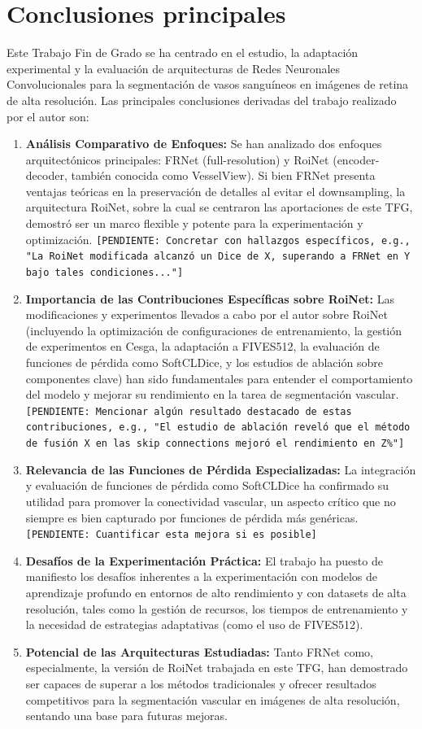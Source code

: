 \documentclass[11pt,a4paper]{report} %
\begin{document}
\section{Conclusiones principales}
Este Trabajo Fin de Grado se ha centrado en el estudio, la adaptación experimental y la evaluación de arquitecturas de Redes Neuronales Convolucionales para la segmentación de vasos sanguíneos en imágenes de retina de alta resolución. Las principales conclusiones derivadas del trabajo realizado por el autor son:
\begin{enumerate}
  \item \textbf{Análisis Comparativo de Enfoques:} Se han analizado dos enfoques arquitectónicos principales: FRNet (full-resolution) y RoiNet (encoder-decoder, también conocida como VesselView). Si bien FRNet presenta ventajas teóricas en la preservación de detalles al evitar el downsampling, la arquitectura RoiNet, sobre la cual se centraron las aportaciones de este TFG, demostró ser un marco flexible y potente para la experimentación y optimización. \texttt{[PENDIENTE: Concretar con hallazgos específicos, e.g., "La RoiNet modificada alcanzó un Dice de X, superando a FRNet en Y bajo tales condiciones..."]}
  \item \textbf{Importancia de las Contribuciones Específicas sobre RoiNet:} Las modificaciones y experimentos llevados a cabo por el autor sobre RoiNet (incluyendo la optimización de configuraciones de entrenamiento, la gestión de experimentos en Cesga, la adaptación a FIVES512, la evaluación de funciones de pérdida como SoftCLDice, y los estudios de ablación sobre componentes clave) han sido fundamentales para entender el comportamiento del modelo y mejorar su rendimiento en la tarea de segmentación vascular. \texttt{[PENDIENTE: Mencionar algún resultado destacado de estas contribuciones, e.g., "El estudio de ablación reveló que el método de fusión X en las skip connections mejoró el rendimiento en Z\%"]}
  \item \textbf{Relevancia de las Funciones de Pérdida Especializadas:} La integración y evaluación de funciones de pérdida como SoftCLDice ha confirmado su utilidad para promover la conectividad vascular, un aspecto crítico que no siempre es bien capturado por funciones de pérdida más genéricas. \texttt{[PENDIENTE: Cuantificar esta mejora si es posible]}
  \item \textbf{Desafíos de la Experimentación Práctica:} El trabajo ha puesto de manifiesto los desafíos inherentes a la experimentación con modelos de aprendizaje profundo en entornos de alto rendimiento y con datasets de alta resolución, tales como la gestión de recursos, los tiempos de entrenamiento y la necesidad de estrategias adaptativas (como el uso de FIVES512).
  \item \textbf{Potencial de las Arquitecturas Estudiadas:} Tanto FRNet como, especialmente, la versión de RoiNet trabajada en este TFG, han demostrado ser capaces de superar a los métodos tradicionales y ofrecer resultados competitivos para la segmentación vascular en imágenes de alta resolución, sentando una base para futuras mejoras.
\end{enumerate}
\end{document}
